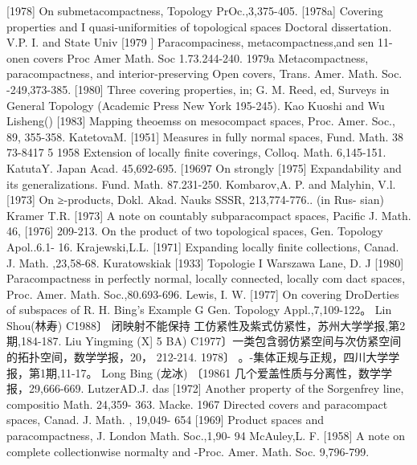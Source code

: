 \documentclass[main.tex]{subfiles}
\begin{document}
[1978]
On submetacompactness, Topology PrOc.,3,375-405.
[1978a]
Covering properties and
I quasi-uniformities of topological spaces
Doctoral dissertation. V.P. I. and State Univ
[1979 ]
Paracompaciness,
metacompactness,and
sen
11-onen
covers
Proc
Amer Math. Soc
1.73.244-240.
1979a Metacompactness, paracompactness, and
interior-preserving Open
covers, Trans. Amer. Math. Soc. -249,373-385.
[1980]
Three covering properties, in; G. M. Reed, ed, Surveys in General
Topology (Academic Press New York 195-245).
Kao Kuoshi and Wu Lisheng()
[1983]
Mapping theoemss on mesocompact spaces, Proc. Amer. Soc., 89,
355-358.
KatetovaM.
[1951]
Measures in fully normal spaces, Fund. Math. 38 73-8417
5 1958 Extension
of locally finite coverings, Colloq. Math. 6,145-151.
KatutaY.
Japan Acad. 45,692-695.
[19697
On strongly
[1975]
Expandability and its generalizations. Fund. Math. 87.231-250.
Kombarov,A. P. and Malyhin, V.l.
[1973] On ≥-products, Dokl. Akad. Nauks SSSR, 213,774-776.. (in Rus-
sian)
Kramer T.R.
[1973]
A note on countably subparacompact spaces, Pacific J. Math. 46,
[1976]
209-213.
On the product of two topological spaces, Gen. Topology Apol..6.1-
16.
Krajewski,L.L.
[1971] Expanding locally finite collections, Canad. J. Math.
,23,58-68.
Kuratowskiak
[1933]
Topologie I Warszawa
Lane, D. J
[1980] Paracompactness in perfectly normal, locally connected, locally com
dact spaces, Proc. Amer. Math. Soc.,80.693-696.
Lewis, I. W.
[1977]
On covering DroDerties of subspaces of R. H. Bing's Example G
Gen. Topology Appl.,7,109-122。
Lin Shou(林寿)
C1988〕 闭映射不能保持 工仿紧性及紫式仿紧性，苏州大学学报,第2
期,184-187.
Liu Yingming (X] 5 BA)
C1977〕一类包含弱仿紧空间与次仿紧空间的拓扑空间，数学学报，20，
212-214.
1978〕 。-集体正规与正规，四川大学学报，第1期,11-17。
Long Bing (龙冰)
〔19861 几个爱盖性质与分离性，数学学报，29,666-669.
LutzerAD.J.
das [1972]
Another property of the Sorgenfrey line, compositio Math. 24,359-
363.
Macke.
1967 Directed covers and paracompact spaces, Canad. J. Math. , 19,049-
654
[1969] Product spaces and paracompactness, J. London Math. Soc.,1,90-
94
McAuley,L. F.
[1958]
A note on complete collectionwise normalty and
-Proc. Amer. Math. Soc. 9,796-799.
\end{document}
